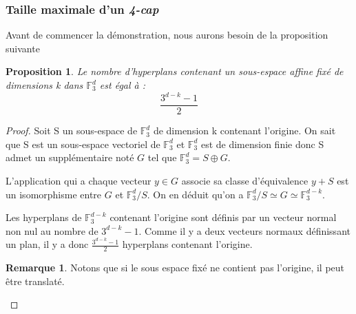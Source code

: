 \documentclass[a4paper,12pt,titlepage]{article}
\theoremstyle{plain}
\newtheorem{prop}{Proposition}
\theoremstyle{definition}
\newtheorem{rmq}{Remarque}
\newcommand{\Ftrois}[1]{\mathbb{F}^#1_3}
\begin{document}
\subsubsection{Taille maximale d'un \emph{4-cap}}
Avant de commencer la démonstration, nous aurons besoin de la proposition suivante
\begin{prop} \label{prop:nbhyp}
  Le nombre d'hyperplans contenant un sous-espace affine fixé de dimensions k dans $\Ftrois{d}$ est égal à :
  \[
  \frac{3^{d-k}-1}{2}
  \]
\end{prop}
\begin{proof}
  Soit S un sous-espace de $\Ftrois{d}$ de dimension k contenant l'origine. On sait que S est un sous-espace vectoriel de $\Ftrois{d}$ et $\Ftrois{d}$ est de dimension finie donc S admet un supplémentaire noté $G$ tel que $\Ftrois{d} = S \oplus G$.

  L'application qui a chaque vecteur $y\in G$ associe sa classe d'équivalence $y + S$ est un isomorphisme entre $G$ et $\Ftrois{d}/S$. On en déduit qu'on a $\Ftrois{d}/S \simeq G \simeq \Ftrois{{d-k}}$.

  Les hyperplans de $\Ftrois{{d-k}}$ contenant l'origine sont définis par un vecteur normal non nul au nombre de $3^{d-k}-1$. Comme il y a deux vecteurs normaux définissant un plan, il y a donc $\frac{3^{d-k}-1}{2}$ hyperplans contenant l'origine.
  \begin{rmq}
    Notons que si le sous espace fixé ne contient pas l'origine, il peut être translaté.
  \end{rmq}
\end{proof}
\end{document}
